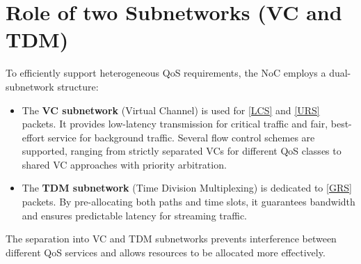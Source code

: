 \section{Role of two Subnetworks (VC and TDM)}

To efficiently support heterogeneous QoS requirements, the NoC employs a dual-subnetwork structure:

\begin{itemize}
    \item The \textbf{VC subnetwork} (Virtual Channel) is used for \ref{LCS} and \ref{URS} packets. It provides low-latency transmission for critical traffic and fair, best-effort service for background traffic. Several flow control schemes are supported, ranging from strictly separated VCs for different QoS classes to shared VC approaches with priority arbitration.
    \item The \textbf{TDM subnetwork} (Time Division Multiplexing) is dedicated to \ref{GRS} packets. By pre-allocating both paths and time slots, it guarantees bandwidth and ensures predictable latency for streaming traffic.
\end{itemize}

The separation into VC and TDM subnetworks prevents interference between different QoS services and allows resources to be allocated more effectively.
 
